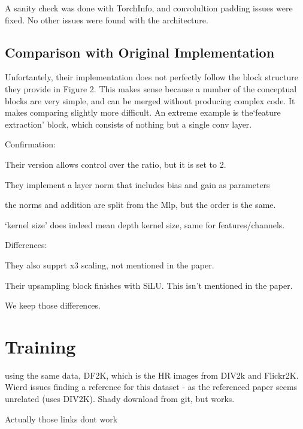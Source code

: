 \documentclass{article}
\begin{document}
    A sanity check was done with TorchInfo, and convolultion padding issues were fixed. No other issues were found with the architecture.

    \subsection{Comparison with Original Implementation}\label{subsec:comparison-with-original-implementation}

    Unfortantely, their implementation does not perfectly follow the block structure they provide in Figure 2. This makes sense because a number of the conceptual blocks are very simple, and can be merged without producing complex code. It makes comparing slightly more difficult. An extreme example is the`feature extraction' block, which consists of nothing but a single conv layer.

    Confirmation:

    Their version allows control over the ratio, but it is set to 2.

    They implement a layer norm that includes bias and gain as parameters

    the norms and addition are split from the Mlp, but the order is the same.

    `kernel size' does indeed mean depth kernel size, same for features/channels.

    Differences:

    They also supprt x3 scaling, not mentioned in the paper.

    Their upsampling block finishes with SiLU. This isn't mentioned in the paper.

    We keep those differences.




    \section{Training}

    using the same data, DF2K, which is the HR images from DIV2k \citep{Agustsson_2017_CVPR_Workshops} and Flickr2K. Wierd issues finding a reference for this dataset - as the referenced paper seems unrelated (uses DIV2K). Shady download from git, but works.


    Actually those links dont work
\end{document}
